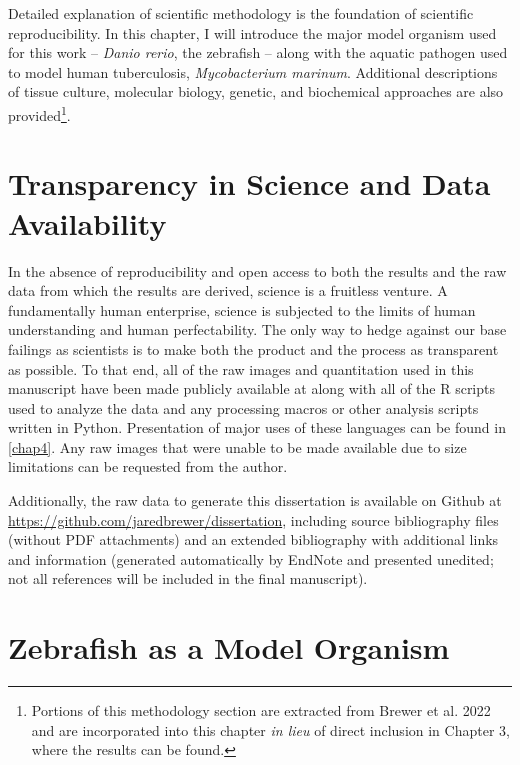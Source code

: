 Detailed explanation of scientific methodology is the foundation of scientific reproducibility. In this chapter, I will introduce the major model organism used for this work -- \textit{Danio rerio}, the zebrafish -- along with the aquatic pathogen used to model human tuberculosis, \textit{Mycobacterium marinum}. Additional descriptions of tissue culture, molecular biology, genetic, and biochemical approaches are also provided\footnote{Portions of this methodology section are extracted from Brewer et al. 2022 and are incorporated into this chapter \textit{in lieu} of direct inclusion in Chapter 3, where the results can be found.}. 

\section{Transparency in Science and Data Availability}\label{transparency}

In the absence of reproducibility and open access to both the results and the raw data from which the results are derived, science is a fruitless venture. A fundamentally human enterprise, science is subjected to the limits of human understanding and human perfectability. The only way to hedge against our base failings as scientists is to make both the product and the process as transparent as possible. To that end, all of the raw images and quantitation used in this manuscript have been made publicly available at \href{https://doi.org/10.5281/zenodo.6816429}{\citet{NFATZenodo}} along with all of the R scripts used to analyze the data and any processing macros or other analysis scripts written in Python. Presentation of major uses of these languages can be found in \autoref{chap4}. Any raw images that were unable to be made available due to size limitations can be requested from the author. 

Additionally, the raw data to generate this dissertation is available on Github at \url{https://github.com/jaredbrewer/dissertation}, including source bibliography files (without PDF attachments) and an extended bibliography with additional links and information (generated automatically by EndNote and presented unedited; not all references will be included in the final manuscript).

\section{Zebrafish as a Model Organism}\label{zebrafish}

